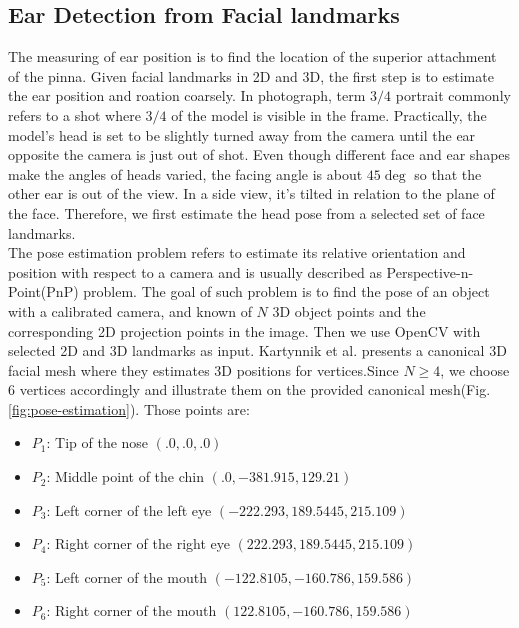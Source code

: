 \subsection{Ear Detection from Facial landmarks}
\label{sec:ear-detection}
The measuring of ear position is to find the location of the superior attachment of the pinna. Given facial landmarks in 2D and 3D, the first step is to estimate the ear position and roation coarsely. In photograph, term $3/4$ portrait commonly refers to a shot where $3/4$ of the model is visible in the frame. Practically, the model's head is set to be slightly turned away from the camera until the ear opposite the camera is just out of shot. Even though different face and ear shapes make the angles of heads varied, the facing angle is about $45\deg$ so that the other ear is out of the view. In a side view, it's tilted in relation to the plane of the face. Therefore, we first estimate the head pose from a selected set of face landmarks.\\
The pose estimation problem refers to estimate its relative orientation and position with respect to a camera and is usually described as Perspective-n-Point(PnP) problem. The goal of such problem is to find the pose of an object with a calibrated camera, and known of $N$ 3D object points and the corresponding 2D projection points in the image. Then we use OpenCV  with selected 2D and 3D landmarks as input. Kartynnik et al.\cite{kartynnik2019real} presents a canonical 3D facial mesh where they estimates 3D positions for vertices.Since $N\geq4$, we choose 6 vertices accordingly and illustrate them on the provided canonical mesh(Fig.\ref{fig:pose-estimation}). Those points are:
\begin{itemize}
  \item $P_1$: Tip of the nose $(.0, .0, .0)$
  \item $P_2$: Middle point of the chin $(.0,  -381.915,  129.21)$
  \item $P_3$: Left corner of the left eye $(-222.293, 189.5445, 215.109)$
  \item $P_4$: Right corner of the right eye $( 222.293, 189.5445, 215.109)$
  \item $P_5$: Left corner of the mouth $(-122.8105, -160.786, 159.586)$
  \item $P_6$: Right corner of the mouth $(122.8105, -160.786, 159.586)$
\end{itemize}
